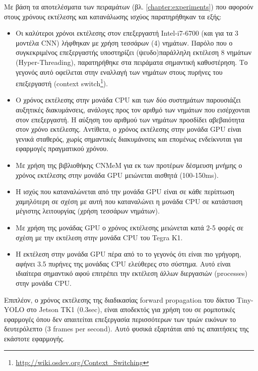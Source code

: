 Με βάση τα αποτελέσματα των πειραμάτων (βλ. \autoref{chapter:experiments})
που αφορούν στους χρόνους εκτέλεσης και κατανάλωσης ισχύος παρατηρήθηκαν τα
εξής:
\begin{itemize}
  \item{
      Οι καλύτεροι χρόνοι εκτέλεσης στον επεξεργαστή Intel-i7-6700 (και για τα 3 μοντέλα CNN)
      λήφθηκαν με χρήση τεσσάρων (4) νημάτων.
      Παρόλο που ο συγκεκριμένος επεξεργαστής υποστηρίζει (ψευδο)παράλληλη
      εκτέλεση 8 νημάτων (Hyper-Threading), παρατηρήθηκε στα πειράματα σημαντική
      καθυστέρηση. Το γεγονός αυτό οφείλεται στην εναλλαγή των νημάτων στους
      πυρήνες του επεξεργαστή
      (context switch\footnote{\url{http://wiki.osdev.org/Context_Switching}}).
    }
  \item{
      Ο χρόνος εκτέλεσης στην μονάδα CPU και των δύο συστημάτων παρουσιάζει αυξητικές διακυμάνσεις,
      ανάλογες προς τον αριθμό των νημάτων που εισέρχονται στον επεξεργαστή.
      Η αύξηση του αριθμού των νημάτων προσδίδει αβεβαιότητα στον χρόνο
      εκτέλεσης. Αντίθετα, ο χρόνος εκτέλεσης στην μονάδα GPU είναι γενικά σταθερός,
      χωρίς σημαντικές διακυμάνσεις και επομένως ενδείκνυται για εφαρμογές
      πραγματικού χρόνου.
      }
  \item{
      Με χρήση της βιβλιοθήκης CNMeM για εκ των προτέρων δέσμευση μνήμης
      ο χρόνος εκτέλεσης στην μονάδα GPU μειώνεται αισθητά (100-150ms).
    }
  \item{
      Η ισχύς που καταναλώνεται από την μονάδα GPU είναι σε κάθε περίπτωση χαμηλότερη σε σχέση
      με αυτή που καταναλώνει η μονάδα CPU σε κατάσταση μέγιστης
      λειτουργίας (χρήση τεσσάρων νημάτων).
    }
  \item{
      Με χρήση της μονάδας GPU ο χρόνος εκτέλεσης μειώνεται κατά
      2-5 φορές σε σχέση με την εκτέλεση στην μονάδα CPU του Tegra K1.
    }
  \item{
      Η εκτέλεση στην μονάδα GPU πέρα από το το γεγονός ότι είναι πιο γρήγορη,
      αφήνει 3.5 πυρήνες της μονάδας CPU ελεύθερες στο σύστημα.
      Αυτό είναι ιδιαίτερα σημαντικό αφού επιτρέπει την εκτέλεση άλλων
      διεργασιών (processes) στην μονάδα CPU.
    }
\end{itemize}

Επιπλέον, ο χρόνος εκτέλεσης της διαδικασίας forward propagation του
δίκτυο Tiny-YOLO στο Jetson TK1 (0.3sec), είναι αποδεκτός
για χρήση του σε ρομποτικές εφαρμογές όπου δεν απαιτείται επεξεργασία
περισσότερων των τριών εικόνων το δευτερόλεπτο (3 frames per second). Αυτό
φυσικά εξαρτάται από τις απαιτήσεις της εκάστοτε εφαρμογής.


